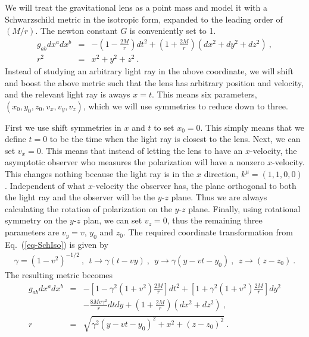 \documentclass[aps,showpacs,onecolumn,floats,prd,superscriptaddress,nofootinbib]{revtex4}
\begin{document}
We will treat the gravitational lens as a point mass and model it with a Schwarzschild metric in the isotropic form, expanded to the leading order of $(M/r)$. 
The newton constant $G$ is conveniently set to 1.
\begin{eqnarray}
g_{ab}dx^adx^b &=& -\left(1-\frac{2M}{r}\right)dt^2 + \left(1+\frac{2M}{r}\right)\left(dx^2+dy^2+dz^2\right)~, \\
r^2 &=& x^2 + y^2 + z^2~.
\label{eq-SchIso}
\end{eqnarray}
Instead of studying an arbitrary light ray in the above coordinate, we will shift and boost the above metric such that the lens has arbitrary position and velocity, and the relevant light ray is aways $x=t$.
This means six parameters, $(x_0,y_0,z_0,v_x,v_y,v_z)$, which we will use symmetries to reduce down to three.

First we use shift symmetries in $x$ and $t$ to set $x_0=0$. This simply means that we define $t=0$ to be the time when the light ray is closest to the lens.
Next, we can set $v_x=0$. 
This means that instead of letting the lens to have an $x$-velocity, the asymptotic observer who measures the polarization will have a nonzero $x$-velocity. 
This changes nothing because the light ray is in the $x$ direction, $k^\mu = (1,1,0,0)$.
Independent of what $x$-velocity the observer has, the plane orthogonal to both the light ray and the observer will be the $y$-$z$ plane.
Thus we are always calculating the rotation of polarization on the $y$-$z$ plane.
Finally, using rotational symmetry on the $y$-$z$ plan, we can set $v_z=0$, thus the remaining three parameters are $v_y=v$, $y_0$ and $z_0$. The required coordinate transformation from Eq.~(\ref{eq-SchIso}) is given by
\begin{eqnarray}
\gamma = (1-v^2)^{-1/2}~, \ \ t \rightarrow \gamma(t-vy)~, \ \ y\rightarrow \gamma(y-vt-y_0)~, \ \
z\rightarrow (z-z_0)~.
\end{eqnarray}
The resulting metric becomes
\begin{eqnarray}
g_{ab}dx^adx^b &=& -\left[1-\gamma^2(1+v^2)\frac{2M}{r}\right]dt^2   
+ \left[1+\gamma^2(1+v^2)\frac{2M}{r}\right]dy^2 
\label{eq-metric}
\\ \nonumber
& & - \frac{8Mv\gamma^2}{r}dtdy + \left(1+\frac{2M}{r}\right)(dx^2+dz^2)~, \\
r &=& \sqrt{ \gamma^2(y-vt-y_0)^2 + x^2 + (z-z_0)^2 }~.
\end{eqnarray}
\end{document}
